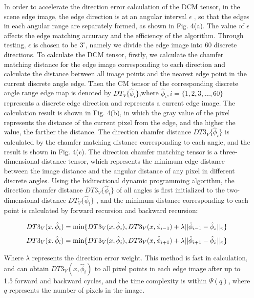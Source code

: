 \documentclass{cta-author}
\begin{document}
In order to accelerate the direction error calculation of the DCM tensor, in the scene edge image, the edge direction is at an angular interval $\epsilon$ , so that the edges in each angular range are separately formed, as shown in Fig. 4(a). The value of $\epsilon$ affects the edge matching accuracy and the efficiency of the algorithm. Through testing, $\epsilon$ is chosen to be $3^\circ$, namely we divide the edge image into 60 discrete directions. To calculate the DCM tensor, firstly, we calculate the chamfer matching distance for the edge image corresponding to each direction and calculate the distance between all image points and the nearest edge point in the current discrete angle edge. Then the CM tensor of the corresponding discrete angle range edge map is denoted by $DT_V\{\hat{\phi}_i\}$,where $\hat{\phi}_{i},i=\{1,2,3,...,60\}$ represents a discrete edge direction and   represents a current edge image. The calculation result is shown in Fig. 4(b), in which the gray value of the pixel represents the distance of the current pixel from the edge, and the higher the value, the farther the distance. The direction chamfer distance  $DT3_V\{\hat{\phi}_i\}$ is calculated by the chamfer matching distance corresponding to each angle, and the result is shown in Fig. 4(c). The direction chamfer matching tensor is a three-dimensional distance tensor, which represents the minimum edge distance between the image distance and the angular distance of any pixel in different discrete angles. Using the bidirectional dynamic programming algorithm, the direction chamfer distance $DT3_V\{\hat{\phi}_i\}$ of all angles is first initialized to the two-dimensional distance $DT_V\{\hat{\phi}_i\}$ , and the minimum distance corresponding to each point is calculated by forward recursion and backward recursion:

\begin{equation}\label{eq6}
  DT3_{V}(x,\hat{\phi}_{i})=\min\{DT3_{V}(x,\hat{\phi}_{i}),DT3_{V}(x,\hat{\phi}_{i-1})\\
  +\lambda||\hat{\phi}_{i-1}-\hat{\phi}_{i}||_{\pi}\}
\end{equation}
\begin{equation}\label{eq7}
    DT3_{V}(x,\hat{\phi}_{i})=\min\{DT3_{V}(x,\hat{\phi}_{i}),DT3_{V}(x,\hat{\phi}_{i+1})\\
    +\lambda||\hat{\phi}_{i+1}-\hat{\phi}_{i}||_{\pi}\}
\end{equation}

Where $\lambda$ represents the direction error weight. This method is fast in calculation, and can obtain $DT3_{V}(x,\hat{\phi}_{i})$ to all pixel points in each edge image after up to 1.5 forward and backward cycles, and the time complexity is within $\Psi(q)$, where $q$ represents the number of pixels in the image.
\end{document}
